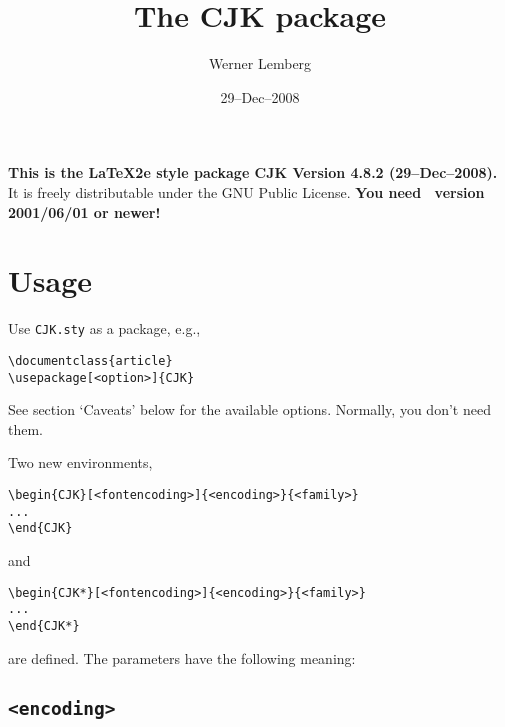 \documentclass[a4paper, 11pt, draft]{article}
\title{The \textsf{CJK} package}
\author{Werner Lemberg}
\date{29--Dec--2008}
\begin{document}
\maketitle

\tableofcontents

\bigskip

\noindent \textbf{This is the LaTeX2e style package CJK Version 4.8.2 (29--Dec--2008).}
It is freely distributable under the GNU Public License.
\textbf{You need \LaTeXe\ version 2001/06/01 or newer!}



\section{Usage}

Use \texttt{CJK.sty} as a package, e.g.,
%
\begin{verbatim}
\documentclass{article}
\usepackage[<option>]{CJK}
\end{verbatim}
%
See section `Caveats' below for the available options. Normally, you don't
need them.

Two new environments,
%
\begin{verbatim}
\begin{CJK}[<fontencoding>]{<encoding>}{<family>}
...
\end{CJK}
\end{verbatim}
%
and
%
\begin{verbatim}
\begin{CJK*}[<fontencoding>]{<encoding>}{<family>}
...
\end{CJK*}
\end{verbatim}
%
are defined. The parameters have the following meaning:


\subsection{\texttt{<encoding>}}
\end{document}
